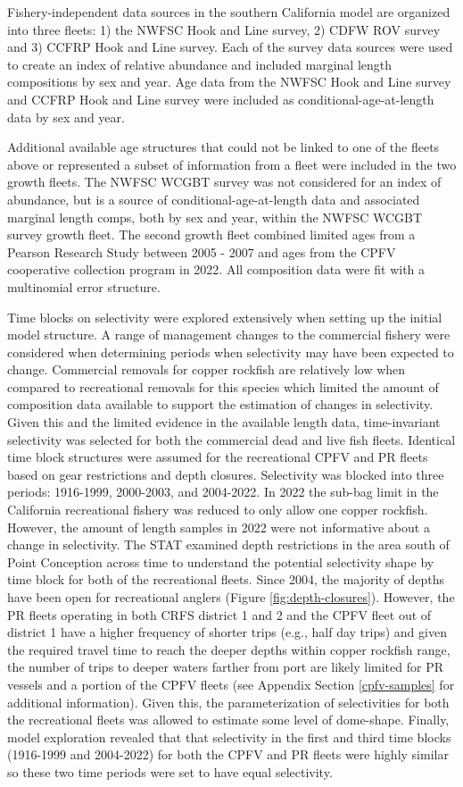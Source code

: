 \documentclass[11pt,
  english,
  letterpaper,
]{article}
\begin{document}
Fishery-independent data sources in the southern California model are organized into three fleets: 1) the NWFSC Hook and Line survey, 2) CDFW ROV survey and 3) CCFRP Hook and Line survey. Each of the survey data sources were used to create an index of relative abundance and included marginal length compositions by sex and year. Age data from the NWFSC Hook and Line survey and CCFRP Hook and Line survey were included as conditional-age-at-length data by sex and year.

Additional available age structures that could not be linked to one of the fleets above or represented a subset of information from a fleet were included in the two growth fleets. The NWFSC WCGBT survey was not considered for an index of abundance, but is a source of conditional-age-at-length data and associated marginal length comps, both by sex and year, within the NWFSC WCGBT survey growth fleet. The second growth fleet combined limited ages from a Pearson Research Study between 2005 - 2007 and ages from the CPFV cooperative collection program in 2022. All composition data were fit with a multinomial error structure.

Time blocks on selectivity were explored extensively when setting up the initial model structure. A range of management changes to the commercial fishery were considered when determining periods when selectivity may have been expected to change. Commercial removals for copper rockfish are relatively low when compared to recreational removals for this species which limited the amount of composition data available to support the estimation of changes in selectivity. Given this and the limited evidence in the available length data, time-invariant selectivity was selected for both the commercial dead and live fish fleets. Identical time block structures were assumed for the recreational CPFV and PR fleets based on gear restrictions and depth closures. Selectivity was blocked into three periods: 1916-1999, 2000-2003, and 2004-2022. In 2022 the sub-bag limit in the California recreational fishery was reduced to only allow one copper rockfish. However, the amount of length samples in 2022 were not informative about a change in selectivity. The STAT examined depth restrictions in the area south of Point Conception across time to understand the potential selectivity shape by time block for both of the recreational fleets. Since 2004, the majority of depths have been open for recreational anglers (Figure \ref{fig:depth-closures}). However, the PR fleets operating in both CRFS district 1 and 2 and the CPFV fleet out of district 1 have a higher frequency of shorter trips (e.g., half day trips) and given the required travel time to reach the deeper depths within copper rockfish range, the number of trips to deeper waters farther from port are likely limited for PR vessels and a portion of the CPFV fleets (see Appendix Section \ref{cpfv-samples} for additional information). Given this, the parameterization of selectivities for both the recreational fleets was allowed to estimate some level of dome-shape. Finally, model exploration revealed that that selectivity in the first and third time blocks (1916-1999 and 2004-2022) for both the CPFV and PR fleets were highly similar so these two time periods were set to have equal selectivity.
\end{document}
